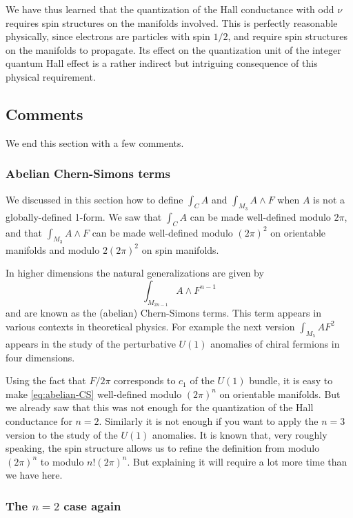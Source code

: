 \documentclass[12pt]{article}
\numberwithin{equation}{section}
\numberwithin{figure}{section}
\theoremstyle{remark}
\begin{document}
We have thus learned that the quantization of the Hall conductance
with odd $\nu$ requires spin structures on the manifolds involved.
This is perfectly reasonable physically,
since electrons are particles with spin $1/2$,
and require spin structures on the manifolds to propagate.
Its effect on the quantization unit of the integer quantum Hall effect
is a rather indirect but intriguing consequence of this physical requirement.

\subsection{Comments}
We end this section with a few comments. 
\subsubsection{Abelian Chern-Simons terms}
We discussed in this section how to define $\int_C A$ and $\int_{M_3} A\wedge F$ 
when $A$ is not a globally-defined 1-form.
We saw that $\int_C A$ can be made well-defined modulo $2\pi$,
and that $\int_{M_3} A\wedge F$ can be made well-defined modulo $(2\pi)^2$
on orientable manifolds and modulo $2(2\pi)^2$ on spin manifolds.

In higher dimensions the natural generalizations are given by \begin{equation}
\int_{M_{2n-1}} A\wedge F^{n-1}\label{eq:abelian-CS}
\end{equation} and are known as the (abelian) Chern-Simons terms.
This term appears in various contexts in theoretical physics.
For example the next version $\int_{M_5} AF^2$ appears 
in the study of the perturbative $U(1)$ anomalies of chiral fermions in four dimensions.

Using the fact that $F/2\pi$ corresponds to $c_1$ of the $U(1)$ bundle,
it is easy to make \eqref{eq:abelian-CS} well-defined 
modulo $(2\pi)^n$ on orientable manifolds.
But we already saw that this was not enough for the quantization of the Hall conductance for $n=2$.
Similarly it is not enough if you want to apply the $n=3$ version to the study of the $U(1)$ anomalies.
It is known that, very roughly speaking, the spin structure allows us to refine the definition from modulo $(2\pi)^n$ to modulo $n! (2\pi)^n$.
But explaining it will require a lot more time than we have here.

\subsubsection{The $n=2$ case again}
\end{document}
